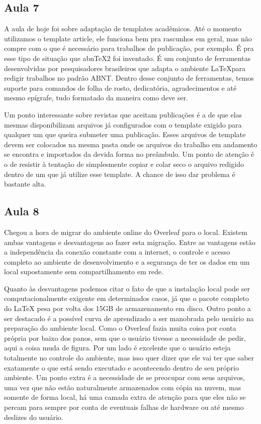 \documentclass[12pt, a4paper, twocolumn] {article} %
\begin{document}
\subsection{Aula 7}
A aula de hoje foi sobre adaptação de templates acadêmicos. Até o momento utilizamos o template article, ele funciona bem pra rascunhos em geral, mas não compre com o que é necessário para trabalhos de publicação, por exemplo. É pra esse tipo de situação que abnTeX2 foi inventado. É um conjunto de ferramentas desenvolvidas por pesquisadores brasileiros que adapta o ambiente \LaTeX para redigir trabalhos no padrão ABNT. Dentro desse conjunto de ferramentas, temos suporte para comandos de folha de rosto, dedicatória, agradecimentos e até mesmo epígrafe, tudo formatado da maneira como deve ser. 

Um ponto interessante sobre revistas que aceitam publicações é a de que elas mesmas disponibilizam arquivos já configurados com o template exigido para qualquer um que queira submeter uma publicação. Esses arquivos de template devem ser colocados na mesma pasta onde os arquivos do trabalho em andamento se encontra e importados da devida forma no preâmbulo. Um ponto de atenção é o de resistir à tentação de simplesmente copiar e colar seco o arquivo redigido dentro de um que já utilize esse template. A chance de isso dar problema é bastante alta.

\subsection{Aula 8}
Chegou a hora de migrar do ambiente online do Overleaf para o local. Existem ambas vantagens e desvantagens ao fazer esta migração. Entre as vantagens estão a independência da conexão constante com a internet, o controle e acesso completo ao ambiente de desenvolvimento e a segurança de ter os dados em um local supostamente sem compartilhamento em rede.

Quanto às desvantagens podemos citar o fato de que a instalação local pode ser computacionalmente exigente em determinados casos, já que o pacote completo do LaTeX pesa por volta dos 15GB de armazenamento em disco. Outro ponto a ser destacado é a possível curva de aprendizado a ser manobrada pelo usuário na preparação do ambiente local. Como o Overleaf fazia muita coisa por conta própria por baixo dos panos, sem que o usuário tivesse a necessidade de pedir, aqui a coisa muda de figura. Por um lado é excelente que o usuário esteja totalmente no controle do ambiente, mas isso quer dizer que ele vai ter que saber exatamente o que está sendo executado e acontecendo dentro de seu próprio ambiente. Um ponto extra é a necessidade de se preocupar com seus arquivos, uma vez que não estão naturalmente armazenados com cópia na nuvem, mas somente de forma local, há uma camada extra de atenção para que eles não se percam para sempre por conta de eventuais falhas de hardware ou até mesmo deslizes do usuário.
\end{document}
